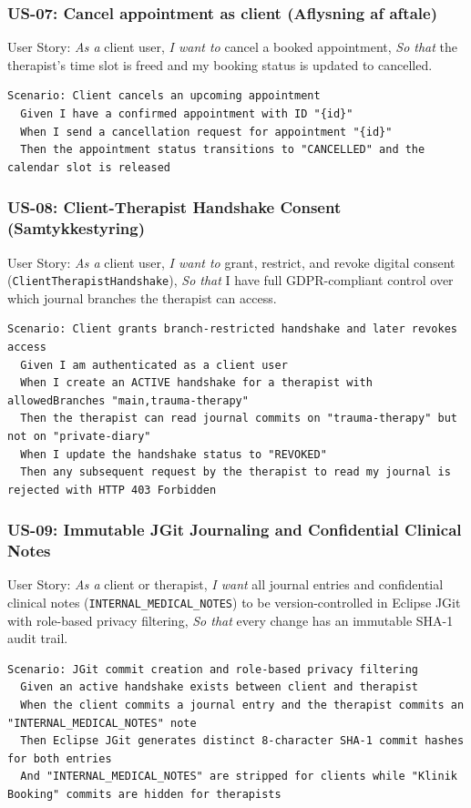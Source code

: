\documentclass[11pt,a4paper]{article}
\begin{document}
\subsubsection{US-07: Cancel appointment as client (Aflysning af aftale)}
User Story: \textit{As a} client user, \textit{I want to} cancel a booked appointment, \textit{So that} the therapist's time slot is freed and my booking status is updated to cancelled.
\begin{lstlisting}[language={}]
Scenario: Client cancels an upcoming appointment
  Given I have a confirmed appointment with ID "{id}"
  When I send a cancellation request for appointment "{id}"
  Then the appointment status transitions to "CANCELLED" and the calendar slot is released
\end{lstlisting}

\subsubsection{US-08: Client-Therapist Handshake Consent (Samtykkestyring)}
User Story: \textit{As a} client user, \textit{I want to} grant, restrict, and revoke digital consent (\texttt{ClientTherapist\allowbreak Handshake}), \textit{So that} I have full GDPR-compliant control over which journal branches the therapist can access.
\begin{lstlisting}[language={}]
Scenario: Client grants branch-restricted handshake and later revokes access
  Given I am authenticated as a client user
  When I create an ACTIVE handshake for a therapist with allowedBranches "main,trauma-therapy"
  Then the therapist can read journal commits on "trauma-therapy" but not on "private-diary"
  When I update the handshake status to "REVOKED"
  Then any subsequent request by the therapist to read my journal is rejected with HTTP 403 Forbidden
\end{lstlisting}

\subsubsection{US-09: Immutable JGit Journaling and Confidential Clinical Notes}
User Story: \textit{As a} client or therapist, \textit{I want} all journal entries and confidential clinical notes (\texttt{INTERNAL\_MEDICAL\_NOTES}) to be version-controlled in Eclipse JGit with role-based privacy filtering, \textit{So that} every change has an immutable SHA-1 audit trail.
\begin{lstlisting}[language={}]
Scenario: JGit commit creation and role-based privacy filtering
  Given an active handshake exists between client and therapist
  When the client commits a journal entry and the therapist commits an "INTERNAL_MEDICAL_NOTES" note
  Then Eclipse JGit generates distinct 8-character SHA-1 commit hashes for both entries
  And "INTERNAL_MEDICAL_NOTES" are stripped for clients while "Klinik Booking" commits are hidden for therapists
\end{lstlisting}
\end{document}
